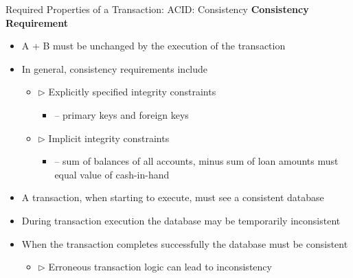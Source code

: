 \documentclass[aspectratio=169, xcolor=dvipsnames]{beamer}
\begin{document}
\begin{frame}{Required Properties of a Transaction: ACID: Consistency}
    \textbf{Consistency Requirement}
    \begin{itemize}[<+->]
        \item A + B must be unchanged by the execution of the transaction
        \item In general, consistency requirements include
        \begin{itemize}[<+->]
            \item $\triangleright$ Explicitly specified integrity constraints
            \begin{itemize}[<+->]
                \item -- primary keys and foreign keys
            \end{itemize}
            \item $\triangleright$ Implicit integrity constraints
            \begin{itemize}[<+->]
                \item -- sum of balances of all accounts, minus sum of loan amounts must equal value of cash-in-hand
            \end{itemize}
        \end{itemize}
        \item A transaction, when starting to execute, must see a consistent database
        \item During transaction execution the database may be temporarily inconsistent
        \item When the transaction completes successfully the database must be consistent
        \begin{itemize}[<+->]
            \item $\triangleright$ Erroneous transaction logic can lead to inconsistency
        \end{itemize}
    \end{itemize}
\end{frame}
\end{document}
